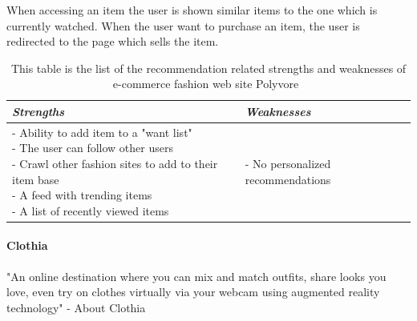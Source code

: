     When accessing an item the user is shown similar items to the one which is currently watched.
    When the user want to purchase an item, the user is redirected to the page which sells the item.
    \begin{table}[H]
        \centering
        \begin{tabular}{l|l}
            \toprule
            \emph{Strengths} & \emph{Weaknesses} \\ \hline
            \pbox{9cm}{
                - Ability to add item to a "want list" \\
                - The user can follow other users \\
                - Crawl other fashion sites to add to their item base \\
                - A feed with trending items \\
                - A list of recently viewed items
            } & \pbox{9cm}{
                - No personalized recommendations \\
            } \\ \bottomrule
        \end{tabular}
        \caption[Recommendation related strengths and weaknesses of Polyvore~\cite{Polyvore}]{This table is the list of the recommendation related strengths and weaknesses of e-commerce fashion web site Polyvore~\cite{Polyvore}}
        \label{table:ecommenrecePolyvore}
    \end{table}


\paragraph{Clothia} %
\label{par:clothia}
    "An online destination where you can mix and match outfits, share looks you love, even try on clothes virtually via your webcam using augmented reality technology" - About Clothia~\cite{clothia}

